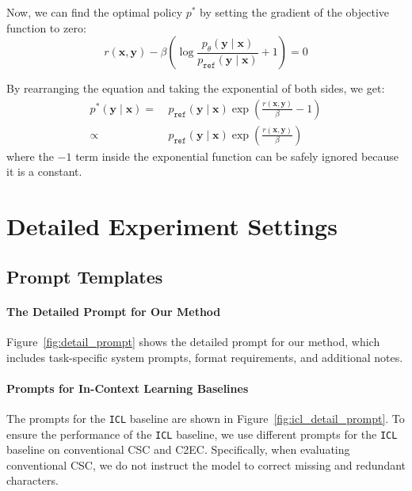 Now, we can find the optimal policy $p^*$ by setting the gradient of the objective function to zero:
\begin{equation}
    r(\boldsymbol{x}, \boldsymbol{y}) - \beta \left(\log \frac{p_{\theta}(\boldsymbol{y}\mid \boldsymbol{x})}{p_{\mathtt{ref}}(\boldsymbol{y}\mid \boldsymbol{x})} + 1\right) = 0
\end{equation}



By rearranging the equation and taking the exponential of both sides, we get:
\begin{equation}
    \begin{aligned}
        p^*(\boldsymbol{y}\mid \boldsymbol{x}) =\  & p_{\mathtt{ref}}(\boldsymbol{y}\mid \boldsymbol{x}) \exp\left(\frac{r(\boldsymbol{x}, \boldsymbol{y})}{\beta} - 1\right) \\
        \propto\                                   & p_{\mathtt{ref}}(\boldsymbol{y}\mid \boldsymbol{x}) \exp\left(\frac{r(\boldsymbol{x}, \boldsymbol{y})}{\beta}\right)
    \end{aligned}
\end{equation}
where the $-1$ term inside the exponential function can be safely ignored because it is a constant.



\section{Detailed Experiment Settings}
\label{sec:detailed_experiment_settings}
\subsection{Prompt Templates}
\label{sec:prompt_templates}
\paragraph{The Detailed Prompt for Our Method}
Figure~\ref{fig:detail_prompt} shows the detailed prompt for our method, which includes task-specific system prompts, format requirements, and additional notes.

\paragraph{Prompts for In-Context Learning Baselines}
The prompts for the \texttt{ICL} baseline are shown in Figure~\ref{fig:icl_detail_prompt}.
To ensure the performance of the \texttt{ICL} baseline, we use different prompts for the \texttt{ICL} baseline on conventional CSC and C2EC.
Specifically, when evaluating conventional CSC, we do not instruct the model to correct missing and redundant characters.

